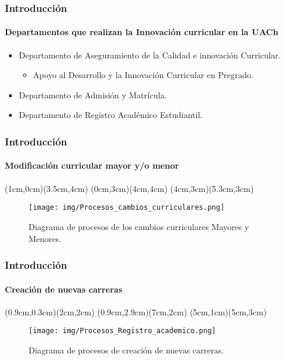 \documentclass{beamer}
\begin{document}





\begin{frame}
\frametitle{Introducción}
\framesubtitle{Departamentos que realizan la Innovación curricular en la UACh}

\begin{itemize}
	\item Departamento de Aseguramiento de la Calidad e innovación Curricular.
	\begin{itemize}
		\item Apoyo al Desarrollo y la Innovación Curricular en Pregrado.
	\end{itemize}
	\item Departamento de Admisión y Matrícula.
	\item Departamento de Registro Académico Estudiantil.

\end{itemize}
\end{frame}




\begin{frame}  
\frametitle{Introducción}     
    \framesubtitle{Modificación curricular mayor y/o menor}
	(1cm,0cm)(3.5cm,4cm)
	(0cm,3cm)(4cm,4cm)
	(4cm,3cm)(5.3cm,3cm) %

    
    \begin{figure}
        \texttt{[image: img/Procesos\_cambios\_curriculares.png]}
        \caption{Diagrama de procesos de los cambios curriculares Mayores y Menores.}
    \end{figure}        
\end{frame} 

\begin{frame}    
\frametitle{Introducción}   
    \framesubtitle{Creación de nuevas carreras}
	(0.9cm,0.3cm)(2cm,2cm)
	(0.9cm,2.9cm)(7cm,2cm)
	(5cm,1cm)(5cm,3cm)
    
    \begin{figure}
        \texttt{[image: img/Procesos\_Registro\_academico.png]}
        \caption{Diagrama de procesos de creación de nuevas carreras.}
    \end{figure}        
\end{frame} 
\end{document}
